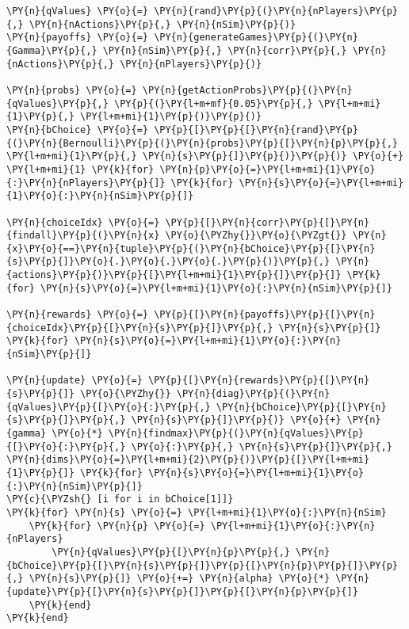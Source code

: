 \documentclass[main.tex]{subfiles}
\begin{document}
    \begin{tcolorbox}[breakable, size=fbox, boxrule=1pt, pad at break*=1mm,colback=cellbackground, colframe=cellborder]
\begin{Verbatim}[commandchars=\\\{\}]
\PY{n}{qValues} \PY{o}{=} \PY{n}{rand}\PY{p}{(}\PY{n}{nPlayers}\PY{p}{,} \PY{n}{nActions}\PY{p}{,} \PY{n}{nSim}\PY{p}{)}
\PY{n}{payoffs} \PY{o}{=} \PY{n}{generateGames}\PY{p}{(}\PY{n}{Gamma}\PY{p}{,} \PY{n}{nSim}\PY{p}{,} \PY{n}{corr}\PY{p}{,} \PY{n}{nActions}\PY{p}{,} \PY{n}{nPlayers}\PY{p}{)}

\PY{n}{probs} \PY{o}{=} \PY{n}{getActionProbs}\PY{p}{(}\PY{n}{qValues}\PY{p}{,} \PY{p}{(}\PY{l+m+mf}{0.05}\PY{p}{,} \PY{l+m+mi}{1}\PY{p}{,} \PY{l+m+mi}{1}\PY{p}{)}\PY{p}{)}
\PY{n}{bChoice} \PY{o}{=} \PY{p}{[}\PY{p}{[}\PY{n}{rand}\PY{p}{(}\PY{n}{Bernoulli}\PY{p}{(}\PY{n}{probs}\PY{p}{[}\PY{n}{p}\PY{p}{,} \PY{l+m+mi}{1}\PY{p}{,} \PY{n}{s}\PY{p}{]}\PY{p}{)}\PY{p}{)} \PY{o}{+} \PY{l+m+mi}{1} \PY{k}{for} \PY{n}{p}\PY{o}{=}\PY{l+m+mi}{1}\PY{o}{:}\PY{n}{nPlayers}\PY{p}{]} \PY{k}{for} \PY{n}{s}\PY{o}{=}\PY{l+m+mi}{1}\PY{o}{:}\PY{n}{nSim}\PY{p}{]}

\PY{n}{choiceIdx} \PY{o}{=} \PY{p}{[}\PY{n}{corr}\PY{p}{[}\PY{n}{findall}\PY{p}{(}\PY{n}{x} \PY{o}{\PYZhy{}}\PY{o}{\PYZgt{}} \PY{n}{x}\PY{o}{==}\PY{n}{tuple}\PY{p}{(}\PY{n}{bChoice}\PY{p}{[}\PY{n}{s}\PY{p}{]}\PY{o}{.}\PY{o}{.}\PY{o}{.}\PY{p}{)}\PY{p}{,} \PY{n}{actions}\PY{p}{)}\PY{p}{[}\PY{l+m+mi}{1}\PY{p}{]}\PY{p}{]} \PY{k}{for} \PY{n}{s}\PY{o}{=}\PY{l+m+mi}{1}\PY{o}{:}\PY{n}{nSim}\PY{p}{]}

\PY{n}{rewards} \PY{o}{=} \PY{p}{[}\PY{n}{payoffs}\PY{p}{[}\PY{n}{choiceIdx}\PY{p}{[}\PY{n}{s}\PY{p}{]}\PY{p}{,} \PY{n}{s}\PY{p}{]} \PY{k}{for} \PY{n}{s}\PY{o}{=}\PY{l+m+mi}{1}\PY{o}{:}\PY{n}{nSim}\PY{p}{]}

\PY{n}{update} \PY{o}{=} \PY{p}{[}\PY{n}{rewards}\PY{p}{[}\PY{n}{s}\PY{p}{]} \PY{o}{\PYZhy{}} \PY{n}{diag}\PY{p}{(}\PY{n}{qValues}\PY{p}{[}\PY{o}{:}\PY{p}{,} \PY{n}{bChoice}\PY{p}{[}\PY{n}{s}\PY{p}{]}\PY{p}{,} \PY{n}{s}\PY{p}{]}\PY{p}{)} \PY{o}{+} \PY{n}{gamma} \PY{o}{*} \PY{n}{findmax}\PY{p}{(}\PY{n}{qValues}\PY{p}{[}\PY{o}{:}\PY{p}{,} \PY{o}{:}\PY{p}{,} \PY{n}{s}\PY{p}{]}\PY{p}{,} \PY{n}{dims}\PY{o}{=}\PY{l+m+mi}{2}\PY{p}{)}\PY{p}{[}\PY{l+m+mi}{1}\PY{p}{]} \PY{k}{for} \PY{n}{s}\PY{o}{=}\PY{l+m+mi}{1}\PY{o}{:}\PY{n}{nSim}\PY{p}{]}
\PY{c}{\PYZsh{} [i for i in bChoice[1]]}
\PY{k}{for} \PY{n}{s} \PY{o}{=} \PY{l+m+mi}{1}\PY{o}{:}\PY{n}{nSim}
    \PY{k}{for} \PY{n}{p} \PY{o}{=} \PY{l+m+mi}{1}\PY{o}{:}\PY{n}{nPlayers}
        \PY{n}{qValues}\PY{p}{[}\PY{n}{p}\PY{p}{,} \PY{n}{bChoice}\PY{p}{[}\PY{n}{s}\PY{p}{]}\PY{p}{[}\PY{n}{p}\PY{p}{]}\PY{p}{,} \PY{n}{s}\PY{p}{]} \PY{o}{+=} \PY{n}{alpha} \PY{o}{*} \PY{n}{update}\PY{p}{[}\PY{n}{s}\PY{p}{]}\PY{p}{[}\PY{n}{p}\PY{p}{]}
    \PY{k}{end}
\PY{k}{end}
\end{Verbatim}
\end{tcolorbox}
\end{document}

